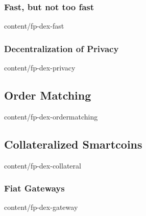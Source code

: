 \documentclass[conference,final,10pt,a4paper]{IEEEtran}
\begin{document}
\subsubsection  { Fast, but not too fast                           }  { content/fp-dex-fast            } 
\subsubsection  { Decentralization of Privacy                      }  { content/fp-dex-privacy         } 
\subsection     { Order Matching                                   }  { content/fp-dex-ordermatching   } 
\subsection     { Collateralized Smartcoins                        }  { content/fp-dex-collateral      } 
\subsubsection  { Fiat Gateways                                    }  { content/fp-dex-gateway         } 

\end{document}
